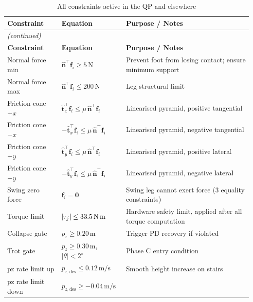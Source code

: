 \documentclass[12pt,a4paper]{report}
\newcommand{\vect}[1]{\bm{#1}}
\begin{document}
\begin{longtable}{p{4cm}p{4cm}p{6cm}}
\caption{All constraints active in the QP and elsewhere}\\
\toprule
\textbf{Constraint} & \textbf{Equation} & \textbf{Purpose / Notes} \\
\midrule
\endfirsthead
\multicolumn{3}{l}{\textit{(continued)}}\\
\toprule
\textbf{Constraint} & \textbf{Equation} & \textbf{Purpose / Notes} \\
\midrule
\endhead
\bottomrule
\endfoot

Normal force min   & $\hat{\vect{n}}^\top\vect{f}_i \geq 5\,\text{N}$
                   & Prevent foot from losing contact; ensure minimum support \\
Normal force max   & $\hat{\vect{n}}^\top\vect{f}_i \leq 200\,\text{N}$
                   & Leg structural limit \\
Friction cone $+x$ & $\hat{\vect{t}}_x^\top\vect{f}_i \leq \mu\,\hat{\vect{n}}^\top\vect{f}_i$
                   & Linearised pyramid, positive tangential \\
Friction cone $-x$ & $-\hat{\vect{t}}_x^\top\vect{f}_i \leq \mu\,\hat{\vect{n}}^\top\vect{f}_i$
                   & Linearised pyramid, negative tangential \\
Friction cone $+y$ & $\hat{\vect{t}}_y^\top\vect{f}_i \leq \mu\,\hat{\vect{n}}^\top\vect{f}_i$
                   & Linearised pyramid, positive lateral \\
Friction cone $-y$ & $-\hat{\vect{t}}_y^\top\vect{f}_i \leq \mu\,\hat{\vect{n}}^\top\vect{f}_i$
                   & Linearised pyramid, negative lateral \\
Swing zero force   & $\vect{f}_i = \vect{0}$
                   & Swing leg cannot exert force (3 equality constraints) \\
Torque limit       & $|\tau_j| \leq 33.5\,\text{N\,m}$
                   & Hardware safety limit, applied after all torque computation \\
Collapse gate      & $p_z \geq 0.20\,\text{m}$
                   & Trigger PD recovery if violated \\
Trot gate          & $p_z \geq 0.30\,\text{m}$,\; $|\theta| < 2^\circ$
                   & Phase C entry condition \\
pz rate limit up   & $\dot{p}_{z,\text{des}} \leq 0.12\,\text{m/s}$
                   & Smooth height increase on stairs \\
pz rate limit down & $\dot{p}_{z,\text{des}} \geq -0.04\,\text{m/s}$

\end{longtable}
\end{document}
